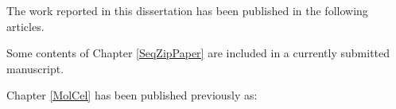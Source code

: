\prefaceSection{}

The work reported in this dissertation has been published in the following articles.

Some contents of Chapter \ref{SeqZipPaper} are included in a currently submitted manuscript. 

Chapter \ref{MolCel} has been published previously as:

  \begin{quote}
    \itshape 
    \singlespacing
    \end{quote}

\clearpage
